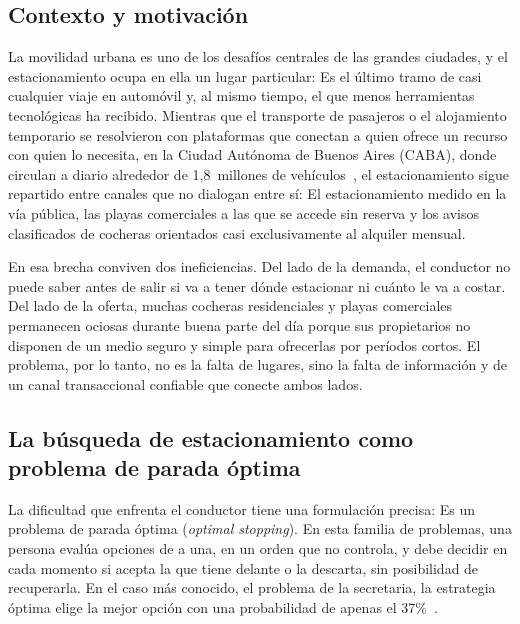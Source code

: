 \documentclass[conference,a4paper]{IEEEtran}
\begin{document}
\subsection{Contexto y motivación}

La movilidad urbana es uno de los desafíos centrales de las grandes ciudades, y el estacionamiento ocupa en ella un lugar particular: Es el último tramo de casi cualquier viaje en automóvil y, al mismo tiempo, el que menos herramientas tecnológicas ha recibido. Mientras que el transporte de pasajeros o el alojamiento temporario se resolvieron con plataformas que conectan a quien ofrece un recurso con quien lo necesita, en la Ciudad Autónoma de Buenos Aires (CABA), donde circulan a diario alrededor de 1,8~millones de vehículos~\cite{superauto2024,aboy2025movilidad}, el estacionamiento sigue repartido entre canales que no dialogan entre sí: El estacionamiento medido en la vía pública, las playas comerciales a las que se accede sin reserva y los avisos clasificados de cocheras orientados casi exclusivamente al alquiler mensual.

En esa brecha conviven dos ineficiencias. Del lado de la demanda, el conductor no puede saber antes de salir si va a tener dónde estacionar ni cuánto le va a costar. Del lado de la oferta, muchas cocheras residenciales y playas comerciales permanecen ociosas durante buena parte del día porque sus propietarios no disponen de un medio seguro y simple para ofrecerlas por períodos cortos. El problema, por lo tanto, no es la falta de lugares, sino la falta de información y de un canal transaccional confiable que conecte ambos lados.

\subsection{La búsqueda de estacionamiento como problema de parada óptima}

La dificultad que enfrenta el conductor tiene una formulación precisa: Es un problema de parada óptima (\textit{optimal stopping}). En esta familia de problemas, una persona evalúa opciones de a una, en un orden que no controla, y debe decidir en cada momento si acepta la que tiene delante o la descarta, sin posibilidad de recuperarla. En el caso más conocido, el problema de la secretaria, la estrategia óptima elige la mejor opción con una probabilidad de apenas el 37\%~\cite{ferguson1989,christian2016}.
\end{document}

